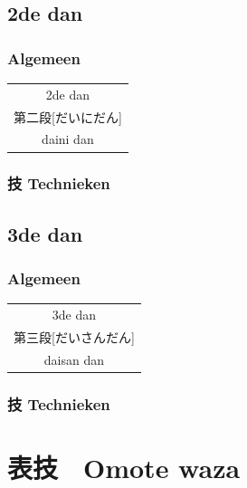 \documentclass[12pt]{scrartcl}
\begin{document}
\begin{CJK*}{UTF8}{min}
\newpage
\subsection{2de dan}
\subsubsection{Algemeen}
\begin{table}[H]
\begin{center}
\begin{tabular}{c}
2de dan\\
第二段[だいにだん]\\
daini dan
\end{tabular}
\end{center}
\label{dan_2_gen}
\end{table}

\subsubsection{技 Technieken}

\newpage
\subsection{3de dan}
\subsubsection{Algemeen}
\begin{table}[H]
\begin{center}
\begin{tabular}{c}
3de dan\\
第三段[だいさんだん]\\
daisan dan
\end{tabular}
\end{center}
\label{dan_2_gen}
\end{table}

\subsubsection{技 Technieken}

\section{表技　Omote waza}


\end{CJK*}
\end{document}
